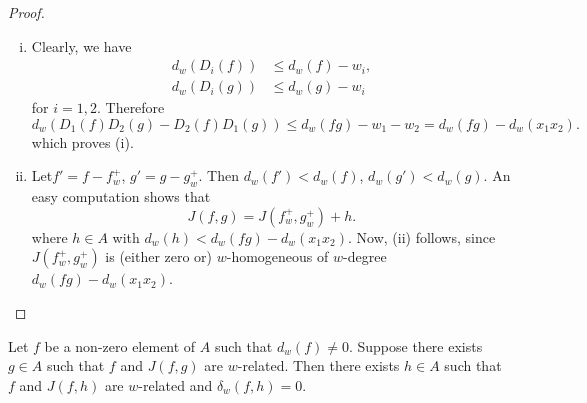 \begin{proof}
  ~
  \begin{enumerate}[(i)]
    \item Clearly, we have
      \begin{align*}
        d_w (D_i (f)) & \leq d_w (f) - w_i,\\
        d_w (D_i(g)) & \leq d_w (g) -w_i
      \end{align*}
      for $i=1, 2$. Therefore
      {\fontsize{10}{12}\selectfont
      $$
      d_w (D_1 (f) D_2 (g) - D_2 (f) D_1 (g)) \leq d_w (fg) - w_1 -
      w_2 = d_w (fg) -d_w (x_1 x_2).
      $$}
      which proves (i).

      \item Let\pageoriginale $f' = f- f^+_w$, $g'= g-g_w^+$. Then $d_w (f')< d_w
        (f)$, $d_w (g')< d_w (g)$. An easy computation shows that
        $$
        J(f, g)= J(f^+_w, g^+_w) +h.
        $$
        where $h \in A$ with $d_w (h) < d_w (fg)- d_w (x_1 x_2)$. Now,
        (ii) follows, since $J(f^+_w, g_w^+)$ is (either zero or)
        $w$-homogeneous of $w$-degree $d_w (fg)-d_w (x_1x_2)$.
  \end{enumerate}
\end{proof}

\begin{lemma}\label{part2:chap6:sec18:lem18.3}
  Let $f$ be a non-zero element of $A$ such that $d_w (f) \neq
  0$. Suppose there exists $g \in A$ such that $f$ and $J(f, g)$ are
  $w$-related. Then there exists $h \in A$ such that $f$ and $J(f, h)$
  are $w$-related and $\delta_w (f, h)=0$.
\end{lemma}

